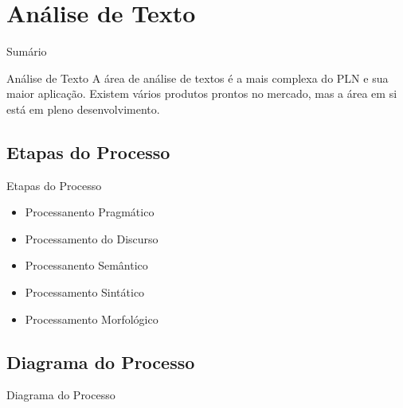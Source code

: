\renewcommand{\titulo}{Análise de Texto}
\section{\titulo}

\begin{frame}{Sumário}
\tableofcontents[currentsection]
\end{frame}

\begin{frame}{\titulo}
A área de análise de textos é a mais complexa do PLN e sua maior aplicação. Existem vários produtos prontos no mercado, mas a área em si está em pleno desenvolvimento.
\end{frame}

\renewcommand{\titulo}{Etapas do Processo}
\subsection{\titulo}
\begin{frame}{\titulo}
\begin{itemize}
\item Processanento Pragmático
\item Processamento do Discurso
\item Processanento Semântico
\item Processamento Sintático
\item Processamento Morfológico
\end{itemize}
\end{frame}

\renewcommand{\titulo}{Diagrama do Processo}
\subsection{\titulo}
\begin{frame}{\titulo}
\end{frame}




